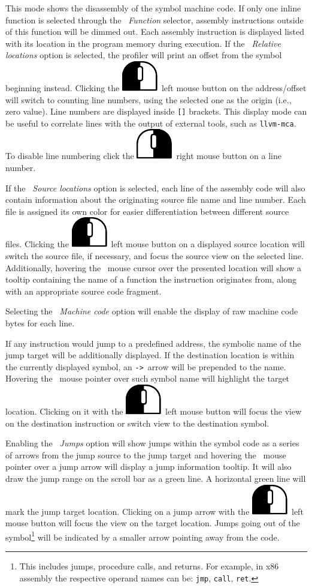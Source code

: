 \documentclass[hidelinks,titlepage,a4paper]{article}
\newcommand{\LMB}{\includegraphics[height=.8\baselineskip]{icons/lmb}}
\newcommand{\RMB}{\includegraphics[height=.8\baselineskip]{icons/rmb}}
\begin{document}
This mode shows the disassembly of the symbol machine code. If only one inline function is selected through the \emph{\faSitemap{}~Function} selector, assembly instructions outside of this function will be dimmed out. Each assembly instruction is displayed listed with its location in the program memory during execution. If the \emph{\faSearchLocation{}~Relative locations} option is selected, the profiler will print an offset from the symbol beginning instead. Clicking the \LMB{}~left mouse button on the address/offset will switch to counting line numbers, using the selected one as the origin (i.e., zero value). Line numbers are displayed inside \texttt{[]} brackets. This display mode can be useful to correlate lines with the output of external tools, such as \texttt{llvm-mca}. To disable line numbering click the \RMB{}~right mouse button on a line number.

If the \emph{\faFileImport{}~Source locations} option is selected, each line of the assembly code will also contain information about the originating source file name and line number. Each file is assigned its own color for easier differentiation between different source files. Clicking the \LMB{}~left mouse button on a displayed source location will switch the source file, if necessary, and focus the source view on the selected line. Additionally, hovering the \faMousePointer{}~mouse cursor over the presented location will show a tooltip containing the name of a function the instruction originates from, along with an appropriate source code fragment.

Selecting the \emph{\faCogs{}~Machine code} option will enable the display of raw machine code bytes for each line.

If any instruction would jump to a predefined address, the symbolic name of the jump target will be additionally displayed. If the destination location is within the currently displayed symbol, an \texttt{->}~arrow will be prepended to the name. Hovering the \faMousePointer{}~mouse pointer over such symbol name will highlight the target location. Clicking on it with the \LMB{}~left mouse button will focus the view on the destination instruction or switch view to the destination symbol.

Enabling the \emph{\faShare{}~Jumps} option will show jumps within the symbol code as a series of arrows from the jump source to the jump target and hovering the \faMousePointer{}~mouse pointer over a jump arrow will display a jump information tooltip. It will also draw the jump range on the scroll bar as a green line. A horizontal green line will mark the jump target location. Clicking on a jump arrow with the \LMB{}~left mouse button will focus the view on the target location. Jumps going out of the symbol\footnote{This includes jumps, procedure calls, and returns. For example, in x86 assembly the respective operand names can be: \texttt{jmp}, \texttt{call}, \texttt{ret}.} will be indicated by a smaller arrow pointing away from the code.
\end{document}

